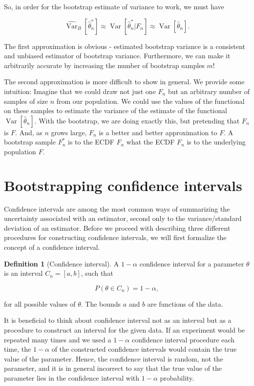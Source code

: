 \documentclass{book}
\theoremstyle{plain}%
\theoremstyle{definition}
\newtheorem{definition}{Definition}[section]
\DeclareMathOperator{\Var}{Var}
\begin{document}
So, in order for the bootstrap estimate of variance to work, we must have

$$\widehat{\Var}_B[\hat{\theta}^*_n] \approx \Var[\hat{\theta}^*_n| F_n] \approx \Var[\hat{\theta}_n].$$

The first approximation is obvious - estimated bootstrap variance is a consistent and unbiased estimator of bootstrap variance. Furthermore, we can make it arbitrarily accurate by increasing the number of bootstrap samples $m$!

The second approximation is more difficult to show in general. We provide some intuition: Imagine that we could draw not just one $F_n$ but an arbitrary number of samples of size $n$ from our population. We could use the values of the functional on these samples to estimate the variance of the estimate of the functional $\Var[\hat{\theta}_n]$. With the bootstrap, we are doing exactly this, but pretending that $F_n$ is $F$. And, as $n$ grows large, $F_n$ is a better and better approximation to $F$. A bootstrap sample $F^*_n$ is to the ECDF $F_n$ what the ECDF $F_n$ is to the underlying population $F$.


\section{Bootstrapping confidence intervals}

Confidence intervals are among the most common ways of summarizing the uncertainty associated with an estimator, second only to the variance/standard deviation of an estimator. Before we proceed with describing three different procedures for constructing confidence intervals, we will first formalize the concept of a confidence interval.

\begin{definition}[Confidence interval]
A $1-\alpha$ confidence interval for a parameter $\theta$ is an interval $C_n = [a,b]$, such that

$$P(\theta \in C_n) = 1-\alpha,$$

for all possible values of $\theta$. The bounds $a$ and $b$ are functions of the data.
\end{definition}

It is beneficial to think about confidence interval not as an interval but as a procedure to construct an interval for the given data. If an experiment would be repeated many times and we used a $1 - \alpha$ confidence interval procedure each time, the $1 - \alpha$ of the constructed confidence intervals would contain the true value of the parameter. Hence, the confidence interval is random, not the parameter, and it is in general incorrect to say that the true value of the parameter lies in the confidence interval with $1 - \alpha$ probability.
\end{document}
